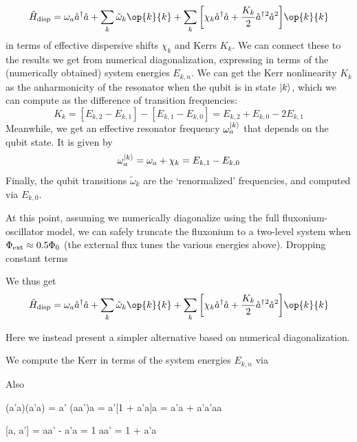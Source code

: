 \begin{equation}
    \hat{H}_{\rm disp} = \omega_a \hat{a}^\dagger\hat{a} + \sum_k \tilde{\omega}_k \op{k}{k} + \sum_k \bigg[\chi_k\hat{a}^\dagger\hat{a} + \frac{K_k}{2}\hat{a}^\dagger{}^2\hat{a}^2\bigg] \op{k}{k}
\end{equation}
in terms of effective dispersive shifts $\chi_k$ and Kerrs $K_k$. We can connect these to the results we get from numerical diagonalization, expressing in terms of the (numerically obtained) system energies $E_{k, n}$. We can get the Kerr nonlinearity $K_k$ as the anharmonicity of the resonator when the qubit is in state $\lvert k\rangle$, which we can compute as the difference of transition frequencies: 
\begin{equation}
    K_k = [E_{k, 2} - E_{k, 1}] - [E_{k, 1} - E_{k, 0}] = E_{k, 2} + E_{k, 0} - 2E_{k, 1}
\end{equation}
Meanwhile, we get an effective  resonator frequency $\omega_a^{\lvert k\rangle}$ that depends on the qubit state. It is given by
\begin{equation}
    \omega_a^{\lvert k\rangle} = \omega_a + \chi_k = E_{k, 1} - E_{k, 0}
\end{equation}
Finally, the qubit transitions $\tilde{\omega}_k$ are the `renormalized' frequencies, and computed via $E_{k, 0}$. 

At this point, assuming we numerically diagonalize using the full fluxonium-oscillator model, we can safely truncate the fluxonium to a two-level system when $\Phi_{\rm ext} \approx 0.5\Phi_0$ (the external flux tunes the various energies above). Dropping constant terms


We thus get
\begin{equation}
    \hat{H}_{\rm disp} = \omega_a \hat{a}^\dagger\hat{a} + \sum_k \tilde{\omega}_k \op{k}{k} + \sum_k \bigg[\chi_k\hat{a}^\dagger\hat{a} + \frac{K_k}{2}\hat{a}^\dagger{}^2\hat{a}^2\bigg] \op{k}{k}
\end{equation}




Here we instead present a simpler alternative based on numerical diagonalization. 


We compute the Kerr in terms of the system energies $E_{k, n}$ via

Also







(a'a)(a'a) = a' (aa')a = a'[1 + a'a]a
= a'a + a'a'aa

[a, a'] = aa' - a'a = 1
aa' = 1 + a'a

